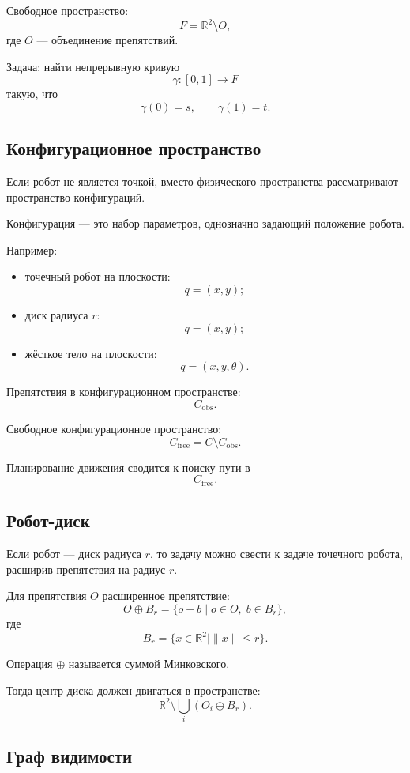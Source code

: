 \documentclass[12pt,a4paper]{article}
\begin{document}
Свободное пространство:
\[
F=\mathbb{R}^2\setminus O,
\]
где \(O\) — объединение препятствий.

Задача: найти непрерывную кривую
\[
\gamma:[0,1]\to F
\]
такую, что
\[
\gamma(0)=s,
\qquad
\gamma(1)=t.
\]

\subsection{Конфигурационное пространство}

Если робот не является точкой, вместо физического пространства рассматривают пространство конфигураций.

Конфигурация — это набор параметров, однозначно задающий положение робота.

Например:

\begin{itemize}
    \item точечный робот на плоскости:
    \[
    q=(x,y);
    \]
    \item диск радиуса \(r\):
    \[
    q=(x,y);
    \]
    \item жёсткое тело на плоскости:
    \[
    q=(x,y,\theta).
    \]
\end{itemize}

Препятствия в конфигурационном пространстве:
\[
C_{\text{obs}}.
\]

Свободное конфигурационное пространство:
\[
C_{\text{free}}=C\setminus C_{\text{obs}}.
\]

Планирование движения сводится к поиску пути в
\[
C_{\text{free}}.
\]

\subsection{Робот-диск}

Если робот — диск радиуса \(r\), то задачу можно свести к задаче точечного робота, расширив препятствия на радиус \(r\).

Для препятствия \(O\) расширенное препятствие:
\[
O\oplus B_r
=
\{o+b\mid o\in O,\; b\in B_r\},
\]
где
\[
B_r=\{x\in\mathbb{R}^2\mid \|x\|\le r\}.
\]

Операция \(\oplus\) называется суммой Минковского.

Тогда центр диска должен двигаться в пространстве:
\[
\mathbb{R}^2\setminus \bigcup_i (O_i\oplus B_r).
\]

\subsection{Граф видимости}
\end{document}
